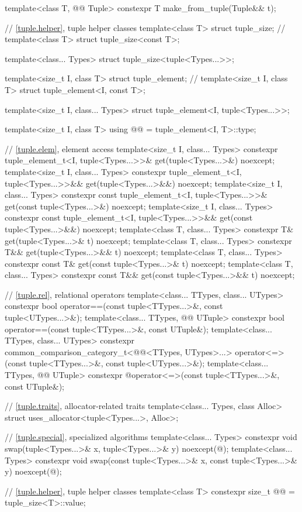 \begin{codeblock}
{  template<class T, @@ Tuple>
    constexpr T make_from_tuple(Tuple&& t);

  // \ref{tuple.helper}, tuple helper classes
  template<class T> struct tuple_size;                  // \notdef
  template<class T> struct tuple_size<const T>;

  template<class... Types> struct tuple_size<tuple<Types...>>;

  template<size_t I, class T> struct tuple_element;     // \notdef
  template<size_t I, class T> struct tuple_element<I, const T>;

  template<size_t I, class... Types>
    struct tuple_element<I, tuple<Types...>>;

  template<size_t I, class T>
    using @@ = tuple_element<I, T>::type;

  // \ref{tuple.elem}, element access
  template<size_t I, class... Types>
    constexpr tuple_element_t<I, tuple<Types...>>& get(tuple<Types...>&) noexcept;
  template<size_t I, class... Types>
    constexpr tuple_element_t<I, tuple<Types...>>&& get(tuple<Types...>&&) noexcept;
  template<size_t I, class... Types>
    constexpr const tuple_element_t<I, tuple<Types...>>& get(const tuple<Types...>&) noexcept;
  template<size_t I, class... Types>
    constexpr const tuple_element_t<I, tuple<Types...>>&& get(const tuple<Types...>&&) noexcept;
  template<class T, class... Types>
    constexpr T& get(tuple<Types...>& t) noexcept;
  template<class T, class... Types>
    constexpr T&& get(tuple<Types...>&& t) noexcept;
  template<class T, class... Types>
    constexpr const T& get(const tuple<Types...>& t) noexcept;
  template<class T, class... Types>
    constexpr const T&& get(const tuple<Types...>&& t) noexcept;

  // \ref{tuple.rel}, relational operators
  template<class... TTypes, class... UTypes>
    constexpr bool operator==(const tuple<TTypes...>&, const tuple<UTypes...>&);
  template<class... TTypes, @@ UTuple>
    constexpr bool operator==(const tuple<TTypes...>&, const UTuple&);
  template<class... TTypes, class... UTypes>
    constexpr common_comparison_category_t<@@<TTypes, UTypes>...>
      operator<=>(const tuple<TTypes...>&, const tuple<UTypes...>&);
  template<class... TTypes, @@ UTuple>
    constexpr @\seebelownc@ operator<=>(const tuple<TTypes...>&, const UTuple&);

  // \ref{tuple.traits}, allocator-related traits
  template<class... Types, class Alloc>
    struct uses_allocator<tuple<Types...>, Alloc>;

  // \ref{tuple.special}, specialized algorithms
  template<class... Types>
    constexpr void swap(tuple<Types...>& x, tuple<Types...>& y) noexcept(@\seebelow@);
  template<class... Types>
    constexpr void swap(const tuple<Types...>& x, const tuple<Types...>& y) noexcept(@\seebelow@);

  // \ref{tuple.helper}, tuple helper classes
  template<class T>
    constexpr size_t @@ = tuple_size<T>::value;
}
\end{codeblock}

